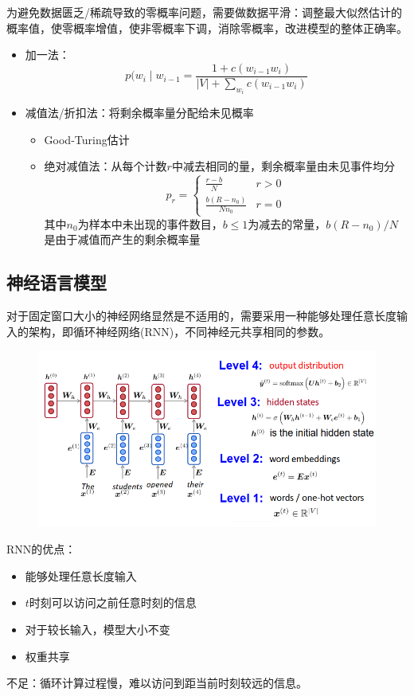 为避免数据匮乏/稀疏导致的零概率问题，需要做数据平滑：调整最大似然估计的概率值，使零概率增值，使非零概率下调，消除零概率，改进模型的整体正确率。
\begin{itemize}
	\item 加一法：
	\[p(w_i\mid w_{i-1}=\frac{1+c(w_{i-1}w_i)}{|V|+\sum_{w_i}c(w_{i-1}w_i)}\]
	\item 减值法/折扣法：将剩余概率量分配给未见概率
	\begin{itemize}
		\item Good-Turing估计
		\item 绝对减值法：从每个计数$r$中减去相同的量，剩余概率量由未见事件均分
		\[p_r=\begin{cases}
		\frac{r-b}{N} & r>0\\
		\frac{b(R-n_0)}{Nn_0} & r=0
		\end{cases}\]
		其中$n_0$为样本中未出现的事件数目，$b\leq 1$为减去的常量，$b(R-n_0)/N$是由于减值而产生的剩余概率量
	\end{itemize}
\end{itemize}

\subsection{神经语言模型}
对于固定窗口大小的神经网络显然是不适用的，需要采用一种能够处理任意长度输入的架构，即循环神经网络(RNN)，不同神经元共享相同的参数。
\begin{figure}[H]
\centering
\includegraphics[width=0.6\linewidth]{fig/RNN.png}
\end{figure}

RNN的优点：
\begin{itemize}
	\item 能够处理任意长度输入
	\item $t$时刻可以访问之前任意时刻的信息
	\item 对于较长输入，模型大小不变
	\item 权重共享
\end{itemize}

不足：循环计算过程慢，难以访问到距当前时刻较远的信息。